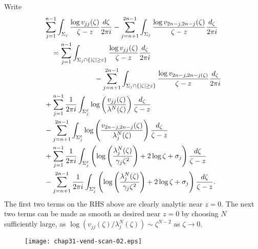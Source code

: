 \documentclass{surv-l}
\theoremstyle{plain}
\theoremstyle{definition}
\numberwithin{equation}{chapter}
\begin{document}
Write
\begin{align}\label{eq31.22}
&\sum_{j=1}^{n-1}\int_{\Sigma_{j}}\frac{\log v_{jj}(\zeta)}{\zeta-z}\frac{d{\zeta}}{2\pi i}-\sum_{j=n+1}^{2n-1}\int_{\Sigma_{j}}\frac{\log v_{2n-j,2n-j}(\zeta)}{\zeta-z}\frac{d_{\zeta}}{2\pi i}\\ \notag
&\quad=\sum_{j=1}^{n-1}\int_{\Sigma_{j}\cap\{|\zeta|\geq\varepsilon\}}\frac{\log v_{jj}(\zeta)}{\zeta-z}\frac{d_{\zeta}}{2\pi i}\\ \notag
&\qquad\qquad\qquad\quad-\sum_{j=n+1}^{2n-1}\int_{\Sigma_{j}\cap\{|\zeta|\geq\varepsilon \}}\frac{\log v_{2n-j,2n-j(\zeta)}}{\zeta-z}\frac{d_{\zeta}}{2\pi i}\\ \notag
&+\sum_{j=1}^{n-1}\frac{1}{2\pi i}\int_{\Sigma_{j}^{\varepsilon}}\log\left(\frac{v_{jj}(\zeta)}{\lambda^{N}(\zeta)}\right)\frac{d_{\zeta}}{\zeta-z}\\ \notag
&-\sum_{j=n+1}^{2n-1}\int_{\Sigma_{j}^{\varepsilon}}\log\left(\frac{v_{2n-j,2n-j}(\zeta)}{\lambda_{j}^{N}(\zeta)}\right)\frac{d_{\zeta}}{\zeta-z}\\ \notag
&+\sum_{j=1}^{n-1}\frac{1}{2\pi i}\int_{\Sigma_{j}^{\varepsilon}}\left(\log\left(\frac{\lambda_{j}^{N}(\zeta)}{\gamma_{j}\zeta^{2}}\right)+2\log\zeta+\sigma_{j}\right)\frac{d{\zeta}}{\zeta-z}\\ \notag
&-\sum_{j=n+1}^{2n-1}\frac{1}{2\pi i}\int_{\Sigma_{j}^{\varepsilon}}\left(\log\left(\frac{\lambda_{j}^{N}(\zeta)}{\gamma_{j}\zeta^{2}}\right)+2\log\zeta+\sigma_{j}\right)\frac{d{\zeta}}{\zeta-z}.
\end{align}
The first two terms on the RHS above are clearly analytic near $z=0$. The next two terms can be made as smooth as desired near $z=0$ by choosing $N$ sufficiently large, as $\log(v_{jj}(\zeta)/\lambda_{j}^{N}(\zeta))\sim\zeta^{N-2}$ as $\zeta \rightarrow 0$.
\begin{figure}
\texttt{[image: chap31-vend-scan-02.eps]}
\caption{}
\end{figure}
\end{document}
